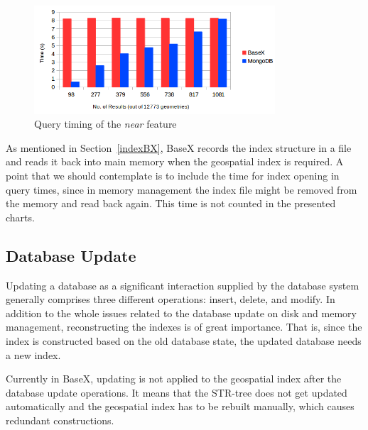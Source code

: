 \documentclass[a4paper,12pt]{article}
\begin{document}
\begin{figure}
\centering
\includegraphics[width=0.8\textwidth]{BXvsMongoNear-newColor-new.png}
\caption{Query timing of the \textit{near} feature}
\label{figBXvsMongoNear}
\end{figure}


As mentioned in Section~\ref{indexBX}, BaseX records the index structure in a file and reads it back into main memory when the geospatial index is required. A point that we should contemplate is to include the time for index opening in query times, since in memory management the index file might be removed from the memory and read back again. This time is not counted in the presented charts.


\subsection{Database Update}
\label{update}
Updating a database as a significant interaction supplied by the database system generally comprises three different operations: insert, delete, and modify. In addition to the whole issues related to the database update on disk and memory management, reconstructing the indexes is of great importance. That is, since the index is constructed based on the old database state, the updated database needs a new index. %

Currently in BaseX, updating is not applied to the geospatial index after the database update operations. It means that the STR-tree does not get updated automatically and the geospatial index has to be rebuilt manually, which causes redundant constructions. %
\end{document}
